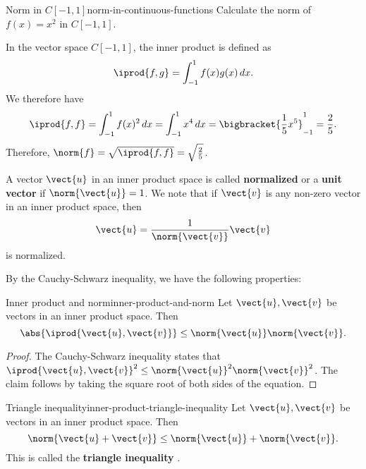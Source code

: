 \begin{example}{Norm in $C[-1,1]$}{norm-in-continuous-functions}
  Calculate the norm of $f(x) = x^2$ in $C[-1,1]$.
\end{example}

\begin{solution}
  In the vector space $C[-1,1]$, the inner product is defined as
  \begin{equation*}
    \iprod{f,g} = \int_{-1}^{1} f(x)g(x)\,dx.
  \end{equation*}
  We therefore have
  \begin{equation*}
    \iprod{f,f}
    = \int_{-1}^{1} f(x)^2\, dx
    = \int_{-1}^{1} x^4\, dx
    = \bigbracket{\frac{1}{5}x^5}_{-1}^{1}
    = \frac{2}{5}.
  \end{equation*}
  Therefore, $\norm{f} = \sqrt{\iprod{f,f}} = \sqrt{\frac{2}{5}}$.
\end{solution}

A vector $\vect{u}$ in an inner product space is called
\textbf{normalized}%
%
 or a \textbf{unit vector}%
%
 if $\norm{\vect{u}} = 1$.
We note that if $\vect{v}$ is any non-zero vector in an inner product
space, then
\begin{equation*}
  \vect{u} = \frac{1}{\norm{\vect{v}}} \vect{v}
\end{equation*}
is normalized.

By the Cauchy-Schwarz inequality, we have the following properties:

\begin{proposition}{Inner product and norm}{inner-product-and-norm}
  Let $\vect{u},\vect{v}$ be vectors in an inner product space. Then
  \begin{equation*}
    \abs{\iprod{\vect{u},\vect{v}}} \leq \norm{\vect{u}}\norm{\vect{v}}.
  \end{equation*}
\end{proposition}

\begin{proof}
  The Cauchy-Schwarz inequality states that
  $\iprod{\vect{u},\vect{v}}^2 \leq
  \norm{\vect{u}}^2\norm{\vect{v}}^2$. The claim follows by taking the
  square root of both sides of the equation.
\end{proof}

\begin{proposition}{Triangle inequality}{inner-product-triangle-inequality}
  Let $\vect{u},\vect{v}$ be vectors in an inner product space. Then
  \begin{equation*}
    \norm{\vect{u}+\vect{v}} \leq \norm{\vect{u}} + \norm{\vect{v}}.
  \end{equation*}
  This is called the \textbf{triangle inequality}%
  .
\end{proposition}

